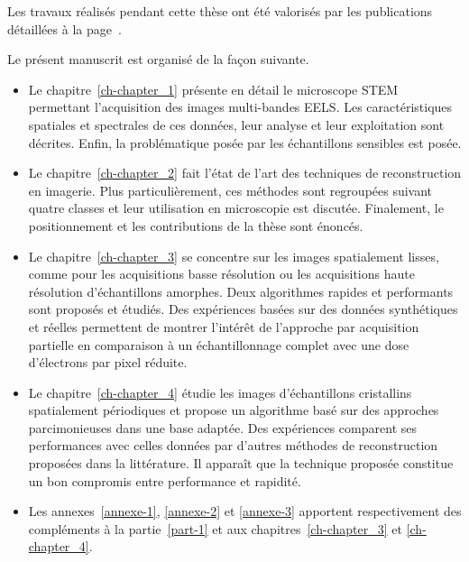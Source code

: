 Les travaux réalisés pendant cette thèse ont été valorisés par les publications détaillées à la page~\pageref{ch-liste-publis}.


 
 
Le présent manuscrit est organisé de la façon suivante.
\begin{itemize}
    \item Le chapitre~\ref{ch-chapter_1} présente en détail le microscope STEM permettant l'acquisition des images multi-bandes EELS. Les caractéristiques spatiales et spectrales de ces données, leur analyse et leur exploitation sont décrites. Enfin, la problématique posée par les échantillons sensibles  est posée.
    \item Le chapitre~\ref{ch-chapter_2} fait l'état de l'art des techniques de reconstruction en imagerie. Plus particulièrement, ces méthodes sont regroupées suivant quatre classes et leur utilisation en microscopie est discutée. Finalement, le positionnement et les contributions de la thèse sont énoncés.
    \item Le chapitre~\ref{ch-chapter_3} se concentre sur les images spatialement lisses, comme pour les acquisitions basse résolution ou les acquisitions haute résolution d'échantillons amorphes. Deux algorithmes rapides et performants sont proposés et étudiés. Des expériences basées sur des données synthétiques et réelles permettent de montrer l'intérêt de l'approche par acquisition partielle en comparaison à un échantillonnage complet avec une dose d'électrons par pixel réduite.
    \item Le chapitre~\ref{ch-chapter_4} étudie les images d'échantillons cristallins spatialement périodiques et propose un algorithme basé sur des approches parcimonieuses dans une base adaptée. Des expériences comparent ses performances avec celles données par d'autres méthodes de reconstruction proposées dans la littérature. Il apparaît que la technique proposée constitue un bon compromis entre performance et rapidité.
    \item Les annexes~\ref{annexe-1}, \ref{annexe-2} et \ref{annexe-3} apportent respectivement des compléments à la partie~\ref{part-1} et aux chapitres~\ref{ch-chapter_3} et \ref{ch-chapter_4}.
\end{itemize} 
 
 
 
 





